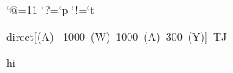 \catcode`@=11
\bgroup\lccode`?=`p \lccode`!=`t\lowercase{\egroup\def\@rmpt#1?!{#1}}
\def\@nopt#1{\expandafter\@rmpt\the\dimexpr#1\relax}
\def\nattrans,{.996264 0 0 .996264 0 0 cm}

\hbox{\pdfliteral direct{[(A) -1000 (W) 1000 (A) 300 (Y)] TJ}}

\hbox{hi}

\bye

